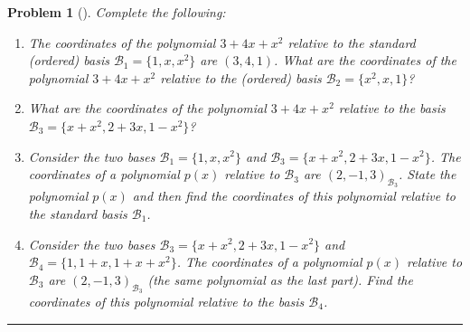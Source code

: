 \documentclass[letterpaper,oneside]{book}%
\theoremstyle{plain}
\theoremstyle{box}
\theoremstyle{problem}
\newtheorem{problemnum}{Problem}[chapter]
\newenvironment{problem}[1][]{\begin{problemnum}[#1]}{\end{problemnum}\nopagebreak\hrule\bigskip}
\begin{document}
\begin{problem}
 Complete the following:
 \begin{enumerate}
  \item 
 The coordinates of the polynomial $3+4x+x^2$ relative to the standard (ordered) basis $\mathscr{B}_1=\{1,x,x^2\}$ are $(3,4,1)$. 
 What are the coordinates of the polynomial $3+4x+x^2$ relative to the (ordered) basis $\mathscr{B}_2=\{x^2,x,1\}$?
  \item 
 What are the coordinates of the polynomial $3+4x+x^2$ relative to the basis $\mathscr{B}_3=\{x+x^2,2+3x,1-x^2\}$?
  \item 
 Consider the two bases $\mathscr{B}_1=\{1,x,x^2\}$ and $\mathscr{B}_3=\{x+x^2,2+3x,1-x^2\}$. The coordinates of a polynomial $p(x)$ relative to $\mathscr{B}_3$ are $(2,-1,3)_{\mathscr{B}_3}$. State the polynomial $p(x)$ and then find the coordinates of this polynomial relative to the standard basis $\mathscr{B}_1$.
  \item 
  Consider the two bases  $\mathscr{B}_3=\{x+x^2,2+3x,1-x^2\}$ and $\mathscr{B}_4=\{1,1+x,1+x+x^2\}$. The coordinates of a polynomial $p(x)$ relative to $\mathscr{B}_3$ are $(2,-1,3)_{\mathscr{B}_3}$ (the same polynomial as the last part). Find the coordinates of this polynomial relative to the basis $\mathscr{B}_4$.
 \end{enumerate}
\end{problem}
\end{document}
